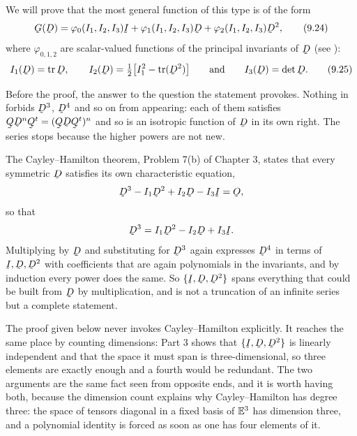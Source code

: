 We will prove that the most general function of this type is of the form
\begin{equation}
   \bG(\bD)=\varphi_{0}(I_{1},I_{2},I_{3})\I
   +\varphi_{1}(I_{1},I_{2},I_{3})\bD
   +\varphi_{2}(I_{1},I_{2},I_{3})\bD^{2},
   \tag{9.24}\label{eq:9.24}
\end{equation}
where $\varphi_{0,1,2}$ are scalar-valued functions of the principal
invariants of $\bD$ (see ):
\begin{equation}
   I_{1}(\bD)=\tr\bD,\qquad
   I_{2}(\bD)=\tfrac12\big[I_{1}^{2}-\tr(\bD^{2})\big]
   \qquad\text{and}\qquad
   I_{3}(\bD)=\det\bD .
   \tag{9.25}\label{eq:9.25}
\end{equation}

\begin{remark}\label{rem:ch9CH}
Before the proof, the answer to the question the statement provokes.
Nothing in  forbids $\bD^{3}$, $\bD^{4}$ and so on from
appearing: each of them satisfies $\bQ\bD^{n}\bQ^{t}=(\bQ\bD\bQ^{t})^{n}$
and so is an isotropic function of $\bD$ in its own right. The series
stops because the higher powers are not new.

The Cayley--Hamilton theorem, Problem 7(b) of Chapter 3, states that
every symmetric $\bD$ satisfies its own characteristic equation,
\[
   \bD^{3}-I_{1}\bD^{2}+I_{2}\bD-I_{3}\I=\Ob ,
\]
so that
\[
   \bD^{3}=I_{1}\bD^{2}-I_{2}\bD+I_{3}\I .
\]
Multiplying by $\bD$ and substituting for $\bD^{3}$ again expresses
$\bD^{4}$ in terms of $\I,\bD,\bD^{2}$ with coefficients that are again
polynomials in the invariants, and by induction every power does the
same. So $\{\I,\bD,\bD^{2}\}$ spans everything that could be built from
$\bD$ by multiplication, and  is not a truncation of an
infinite series but a complete statement.

The proof given below never invokes Cayley--Hamilton explicitly. It
reaches the same place by counting dimensions: Part 3 shows that
$\{\I,\bD,\bD^{2}\}$ is linearly independent and that the space it must
span is three-dimensional, so three elements are exactly enough and a
fourth would be redundant. The two arguments are the same fact seen from
opposite ends, and it is worth having both, because the dimension count
explains why Cayley--Hamilton has degree three: the space of
tensors diagonal in a fixed basis of $\mathbb{E}^{3}$ has dimension three, and a
polynomial identity is forced as soon as one has four elements of it.
\end{remark}

